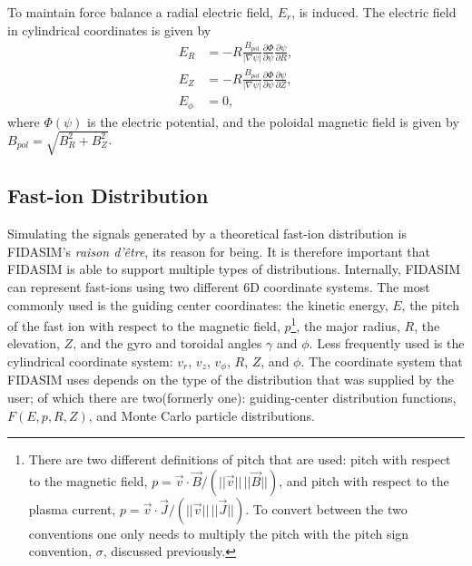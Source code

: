 To maintain force balance a radial electric field, $E_r$, is induced. The electric field in cylindrical coordinates is given by
\begin{equation}\label{eq:efield}
\begin{split}
    E_R &= -R \frac{B_{pol}}{|\nabla \psi|} \frac{\partial \Phi}{\partial \psi} \frac{\partial \psi}{\partial R},\\
    E_Z &= -R \frac{B_{pol}}{|\nabla \psi|} \frac{\partial \Phi}{\partial \psi} \frac{\partial \psi}{\partial Z},\\
    E_{\phi} &= 0,
\end{split}
\end{equation}
where $\Phi(\psi)$ is the electric potential, and the poloidal magnetic field is given by $B_{pol} = \sqrt{B_R^2 + B_Z^2}$.


\subsection{Fast-ion Distribution}
Simulating the signals generated by a theoretical fast-ion distribution is FIDASIM's \textit{raison d'\^etre}, its reason for being. It is therefore important that FIDASIM is able to support multiple types of distributions.
Internally, FIDASIM can represent fast-ions using two different 6D coordinate systems. The most commonly used is the guiding center coordinates: the kinetic energy, $E$, the pitch of the fast ion with respect to the magnetic field, $p$\footnote{There are two different definitions of pitch that are used: pitch with respect to the magnetic field, $p = \vec{v}\cdot\vec{B}/(||\vec{v}||\,||\vec{B}||)$, and pitch with respect to the plasma current, $p = \vec{v}\cdot\vec{J}/(||\vec{v}||\,||\vec{J}||)$. To convert between the two conventions one only needs to multiply the pitch with the pitch sign convention, $\sigma$, discussed previously.}, the major radius, $R$, the elevation, $Z$, and the gyro and toroidal angles $\gamma$ and $\phi$. Less frequently used is the cylindrical coordinate system: $v_r$, $v_z$, $v_\phi$, $R$, $Z$, and $\phi$.
The coordinate system that FIDASIM uses depends on the type of the distribution that was supplied by the user; of which there are two(formerly one): guiding-center distribution functions, $F(E,p,R,Z)$, and Monte Carlo particle distributions.

